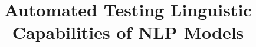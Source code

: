 \documentclass[sigconf,review,anonymous]{acmart}
\begin{document}
\def\BibTeX{{\rm B\kern-.05em{\sc i\kern-.025em b}\kern-.08em
    T\kern-.1667em\lower.7ex\hbox{E}\kern-.125emX}}


\title{Automated Testing Linguistic Capabilities of NLP Models}



\maketitle




%







\clearpage

% 



%

\end{document}
